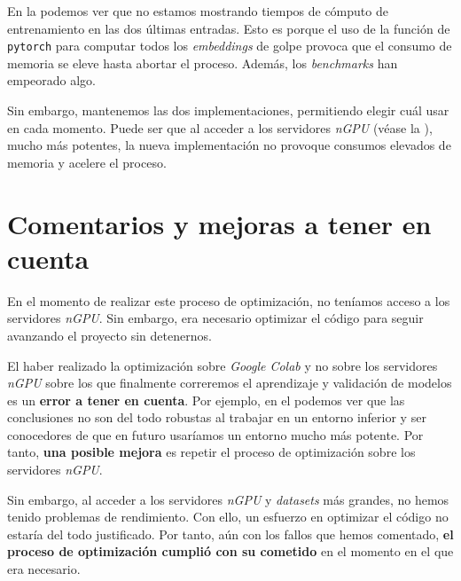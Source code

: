 En la  podemos ver que no estamos mostrando tiempos de cómputo de entrenamiento en las dos últimas entradas. Esto es porque el uso de la función de \lstinline{pytorch} para computar todos los \textit{embeddings} de golpe provoca que el consumo de memoria se eleve hasta abortar el proceso. Además, los \textit{benchmarks} han empeorado algo.

Sin embargo, mantenemos las dos implementaciones, permitiendo elegir cuál usar en cada momento. Puede ser que al acceder a los servidores \textit{nGPU} (véase la ), mucho más potentes, la nueva implementación no provoque consumos elevados de memoria y acelere el proceso.

\section{Comentarios y mejoras a tener en cuenta}

En el momento de realizar este proceso de optimización, no teníamos acceso a los servidores \textit{nGPU}. Sin embargo, era necesario optimizar el código para seguir avanzando el proyecto sin detenernos.

El haber realizado la optimización sobre \textit{Google Colab} y no sobre los servidores \textit{nGPU} sobre los que finalmente correremos el aprendizaje y validación de modelos es un \textbf{error a tener en cuenta}. Por ejemplo, en el  podemos ver que las conclusiones no son del todo robustas al trabajar en un entorno inferior y ser conocedores de que en futuro usaríamos un entorno mucho más potente. Por tanto, \textbf{una posible mejora} es repetir el proceso de optimización sobre los servidores \textit{nGPU}.

Sin embargo, al acceder a los servidores \textit{nGPU} y \textit{datasets} más grandes, no hemos tenido problemas de rendimiento. Con ello, un esfuerzo en optimizar el código no estaría del todo justificado. Por tanto, aún con los fallos que hemos comentado, \textbf{el proceso de optimización cumplió con su cometido} en el momento en el que era necesario.

